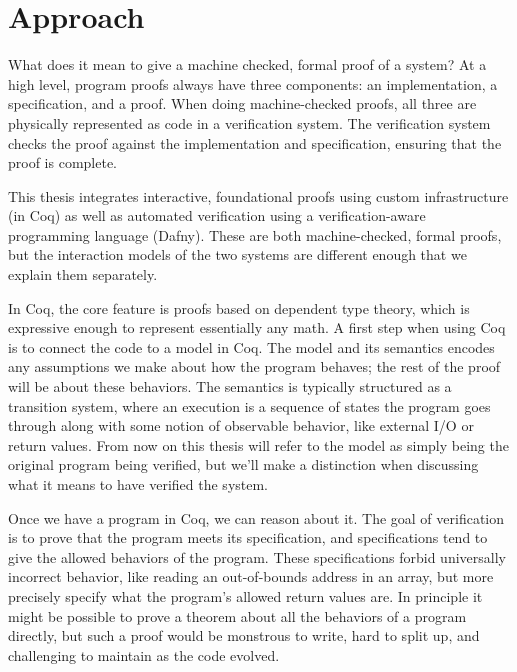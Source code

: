
\section{Approach}

What does it mean to give a machine checked, formal proof of a system? At a high
level, program proofs always have three components: an implementation, a
specification, and a proof. When doing machine-checked proofs, all three are
physically represented as code in a verification system. The verification system
checks the proof against the implementation and specification, ensuring that the
proof is complete.


This thesis integrates interactive, foundational proofs using custom
infrastructure (in Coq) as well as automated verification using a
verification-aware programming language (Dafny). These are both machine-checked,
formal proofs, but the interaction models of the two systems are different
enough that we explain them separately.

In Coq, the core feature is proofs based on dependent type theory, which is
expressive enough to represent essentially any math. A first step when using Coq
is to connect the code to a model in Coq. The model and its semantics encodes any
assumptions we make about how the program behaves; the rest of the proof will be
about these behaviors. The semantics is typically structured as a transition
system, where an execution is a sequence of states the program goes through
along with some notion of observable behavior, like external I/O or return
values. From now on this thesis will refer to the model as simply being the original
program being verified,
but we'll make a distinction when discussing what it means to have verified
the system.

Once we have a program in Coq, we can reason about it. The goal of
verification is to prove that the program meets its specification, and
specifications tend to give the allowed behaviors of the program. These
specifications forbid universally incorrect behavior, like reading an
out-of-bounds address in an array, but more precisely specify what the program's
allowed return values are. In principle it might be possible to prove a theorem
about all the behaviors of a program directly, but such a proof would be
monstrous to write, hard to split up, and challenging to maintain as the code
evolved.

